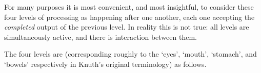 \documentclass{book}
\begin{document}
For many purposes it is most convenient, and most insightful,
to consider these four levels of processing as happening
after one another, each one accepting the {\em completed\/}
output of the previous level. In reality this is not true:
all levels are simultaneously
active, and there is interaction between them.

The four levels are (corresponding roughly
to the `eyes', `mouth', `stomach', and `bowels' respectively
in Knuth's original terminology) as follows.
\end{document}
